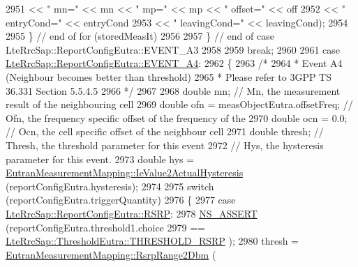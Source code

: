 \begin{DoxyCode}
2951                                << \textcolor{stringliteral}{" mn="} << mn << \textcolor{stringliteral}{" mp="} << mp << \textcolor{stringliteral}{" offset="} << off
2952                                << \textcolor{stringliteral}{" entryCond="} << entryCond
2953                                << \textcolor{stringliteral}{" leavingCond="} << leavingCond);
2954 
2955           \} \textcolor{comment}{// end of for (storedMeasIt)}
2956 
2957       \} \textcolor{comment}{// end of case LteRrcSap::ReportConfigEutra::EVENT\_A3}
2958 
2959       \textcolor{keywordflow}{break};
2960 
2961     \textcolor{keywordflow}{case} \hyperlink{structns3_1_1LteRrcSap_1_1ReportConfigEutra_ab8152dc095987f60bee2e9115046902fa6b8e5f5e5eea05c9441816bd32aaf6c0}{LteRrcSap::ReportConfigEutra::EVENT\_A4}:
2962       \{
2963         \textcolor{comment}{/*}
2964 \textcolor{comment}{         * Event A4 (Neighbour becomes better than threshold)}
2965 \textcolor{comment}{         * Please refer to 3GPP TS 36.331 Section 5.5.4.5}
2966 \textcolor{comment}{         */}
2967 
2968         \textcolor{keywordtype}{double} mn; \textcolor{comment}{// Mn, the measurement result of the neighbouring cell}
2969         \textcolor{keywordtype}{double} ofn = measObjectEutra.offsetFreq; \textcolor{comment}{// Ofn, the frequency specific offset of the frequency of
       the}
2970         \textcolor{keywordtype}{double} ocn = 0.0; \textcolor{comment}{// Ocn, the cell specific offset of the neighbour cell}
2971         \textcolor{keywordtype}{double} thresh; \textcolor{comment}{// Thresh, the threshold parameter for this event}
2972         \textcolor{comment}{// Hys, the hysteresis parameter for this event.}
2973         \textcolor{keywordtype}{double} hys = \hyperlink{classns3_1_1EutranMeasurementMapping_ac0c6d0adbba21c8531600fed399f9f21}{EutranMeasurementMapping::IeValue2ActualHysteresis}
       (reportConfigEutra.hysteresis);
2974 
2975         \textcolor{keywordflow}{switch} (reportConfigEutra.triggerQuantity)
2976           \{
2977           \textcolor{keywordflow}{case} \hyperlink{structns3_1_1LteRrcSap_1_1ReportConfigEutra_a82343ddf526faba0483431ea5882a3efa5b7591e86ab7bcefc7fe1528762114d7}{LteRrcSap::ReportConfigEutra::RSRP}:
2978             \hyperlink{assert_8h_a6dccdb0de9b252f60088ce281c49d052}{NS\_ASSERT} (reportConfigEutra.threshold1.choice
2979                        == \hyperlink{structns3_1_1LteRrcSap_1_1ThresholdEutra_ad3ed2704b836132980dd2e97cb03822ca0663d5baa9382bd755acb712f6ebf707}{LteRrcSap::ThresholdEutra::THRESHOLD\_RSRP}
      );
2980             thresh = \hyperlink{classns3_1_1EutranMeasurementMapping_a695a24d417b914a41b05a450cc1e1f9e}{EutranMeasurementMapping::RsrpRange2Dbm} (

\end{DoxyCode}
